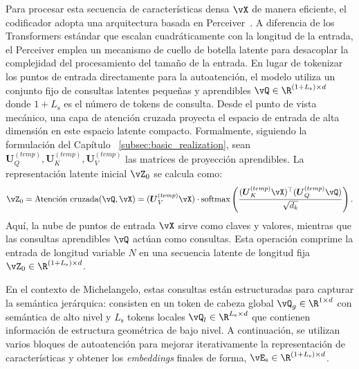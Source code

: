 \documentclass[../../book-main_es.tex]{subfiles}
\begin{document}
Para procesar esta secuencia de características densa $\vX$ de manera eficiente,
el codificador adopta una
arquitectura basada en Perceiver~\cite{pmlr-v139-jaegle21a}. A diferencia de
los Transformers estándar que escalan cuadráticamente con la longitud de la entrada,
el Perceiver emplea un mecanismo de cuello de botella latente para desacoplar
la complejidad del procesamiento del tamaño de la entrada. En lugar de tokenizar los
puntos de entrada directamente para la autoatención, el modelo utiliza un conjunto fijo
de consultas latentes pequeñas y aprendibles $\vQ \in \R^{(1+L_{\mathrm{s}}) \times d}$ 
donde $1 + L_{\mathrm{s}}$ es el número de tokens de consulta.
Desde el punto de vista mecánico, una capa de atención cruzada proyecta el espacio de entrada de alta dimensión
en este espacio latente compacto. Formalmente, siguiendo la formulación del Capítulo ~\ref{subsec:basic_realization}, sean $\boldsymbol{U}^{(temp)}_{Q}, \boldsymbol{U}^{(temp)}_{K}, \boldsymbol{U}^{(temp)}_{V}$ las matrices de proyección aprendibles. La representación latente inicial
$\vZ_0$ se calcula como:
$$\vZ_0 = \text{Atención cruzada}
(\vQ, \vX) = (\boldsymbol{U}^{(temp)}_{V}\vX) \cdot \text{softmax}\left(\frac{(\boldsymbol{U}^{(temp)}_{K}\vX)^\top(\boldsymbol{U}^{(temp)}_{Q}\vQ)}
{\sqrt{d_k}}\right).$$
Aquí, la nube de puntos de entrada $\vX$ sirve
como claves y valores, mientras que las consultas aprendibles $\vQ$ actúan como
consultas. Esta operación comprime la entrada de longitud variable $N$ en una
secuencia latente de longitud fija $\vZ_0 \in \R^{(1+L_{\mathrm{s}}) \times
d}$.

En el contexto de Michelangelo, estas consultas están estructuradas para
capturar la semántica jerárquica: consisten en un token de cabeza global $\vQ_g \in \R^{1 \times d}$ con semántica de alto nivel y
$L_{\mathrm{s}}$ tokens locales $\vQ_l \in \R^{L_{\mathrm{s}} \times d}$
que contienen información de estructura geométrica de bajo nivel. A continuación, se utilizan varios
bloques de autoatención para mejorar iterativamente la representación de características
y obtener los \textit{embeddings} finales de forma, $\vE_{\mathrm{s}}
\in \R^{(1+L_{\mathrm{s}}) \times d}$.

\end{document}
